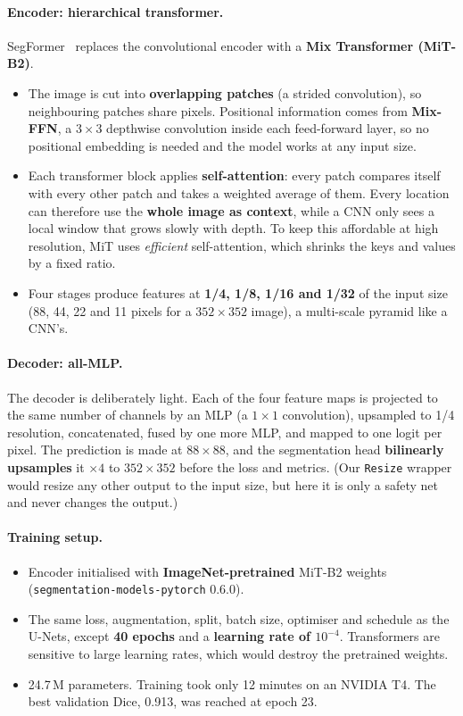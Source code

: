 \paragraph{Encoder: hierarchical transformer.}
SegFormer~\cite{xie2021segformer} replaces the convolutional encoder with a \textbf{Mix Transformer (MiT-B2)}.
\begin{itemize}
  \item The image is cut into \textbf{overlapping patches} (a strided convolution), so neighbouring patches share pixels.
        Positional information comes from \textbf{Mix-FFN}, a $3\times3$ depthwise convolution inside each feed-forward layer,
        so no positional embedding is needed and the model works at any input size.
  \item Each transformer block applies \textbf{self-attention}: every patch compares itself with every other patch and
        takes a weighted average of them. Every location can therefore use the \textbf{whole image as context}, while a
        CNN only sees a local window that grows slowly with depth. To keep this affordable at high resolution,
        MiT uses \emph{efficient} self-attention, which shrinks the keys and values by a fixed ratio.
  \item Four stages produce features at \textbf{1/4, 1/8, 1/16 and 1/32} of the input size (88, 44, 22 and 11 pixels for
        a $352\times352$ image), a multi-scale pyramid like a CNN's.
\end{itemize}

\paragraph{Decoder: all-MLP.}
The decoder is deliberately light. Each of the four feature maps is projected to the same number of channels
by an MLP (a $1\times1$ convolution), upsampled to 1/4 resolution, concatenated, fused by one more MLP, and mapped to
one logit per pixel. The prediction is made at \textbf{$88\times88$}, and the segmentation head \textbf{bilinearly upsamples} it
$\times4$ to $352\times352$ before the loss and metrics. (Our \texttt{Resize} wrapper would resize any other output to the input
size, but here it is only a safety net and never changes the output.)

\paragraph{Training setup.}
\begin{itemize}
  \item Encoder initialised with \textbf{ImageNet-pretrained} MiT-B2 weights (\texttt{segmentation-models-pytorch} 0.6.0).
  \item The same loss, augmentation, split, batch size, optimiser and schedule as the U-Nets, except
        \textbf{40 epochs} and a \textbf{learning rate of $10^{-4}$}. Transformers are sensitive to large learning rates, which
        would destroy the pretrained weights.
  \item 24.7\,M parameters. Training took only 12 minutes on an NVIDIA T4. The best validation Dice, 0.913, was
        reached at epoch 23.
\end{itemize}

